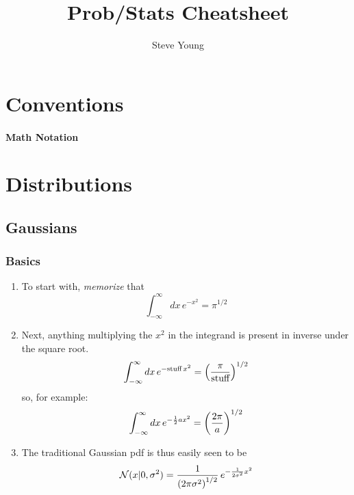 \documentclass[11pt]{article}
\title{Prob/Stats Cheatsheet}
\author{Steve Young}
\begin{document}
\maketitle

\section{Conventions}
\paragraph{Math Notation}



\section{Distributions}
\subsection{Gaussians}
\subsubsection{Basics}
\begin{enumerate}
  \item To start with, \emph{memorize} that
  \begin{equation}
    \boxed{\int_{-\infty}^{\infty} dx\, e^{-x^2} = \pi^{1/2}}
  \end{equation}

  \item Next, anything multiplying the $x^2$ in the integrand is present in inverse
  under the square root.
  \begin{equation}
    \int_{-\infty}^{\infty} dx\, e^{-\textrm{stuff}\, x^2} =
    \left( \frac{\pi}{\textrm{stuff}} \right)^{1/2}
  \end{equation}
  so, for example:
  \begin{equation}
    \label{eq:int_gauss_a2}
    \int_{-\infty}^{\infty} dx\, e^{-\frac{1}{2} a x^2} = \left( \frac{2 \pi}{a} \right)^{1/2} 
  \end{equation}

  \item The traditional Gaussian pdf is thus easily seen to be
  \begin{equation}
    \mathcal{N}(x|0,\sigma^2) = \frac{1}{\left( 2 \pi \sigma^2 \right)^{1/2}}\,
    e^{-\frac{1}{2 \sigma^2} x^2}
  \end{equation}
\end{enumerate}
\end{document}
